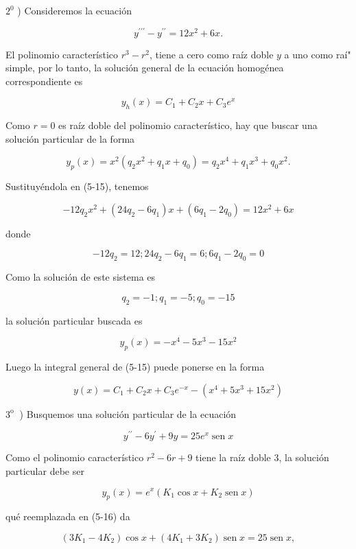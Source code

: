 \documentclass[10pt]{article}
\theoremstyle{plain}
\theoremstyle{definition}
\theoremstyle{remark}
\begin{document}
$2^{0}$ ) Consideremos la ecuación


\begin{equation*}
y^{\prime \prime \prime}-y^{\prime \prime}=12 x^{2}+6 x . \tag{5-15}
\end{equation*}


El polinomio característico $r^{3}-r^{2}$, tiene a cero como raíz doble $y$ a uno como raí" simple, por lo tanto, la solución general de la ecuación homogénea correspondiente es


$$
y_{h}(x)=C_{1}+C_{2} x+C_{3} e^{x}
$$

Como $r=0$ es raíz doble del polinomio característico, hay que buscar una solución particular de la forma

$$
y_{p}(x)=x^{2}\left(q_{2} x^{2}+q_{1} x+q_{0}\right)=q_{2} x^{4}+q_{1} x^{3}+q_{0} x^{2} .
$$

Sustituyéndola en (5-15), tenemos

$$
-12 q_{2} x^{2}+\left(24 q_{2}-6 q_{1}\right) x+\left(6 q_{1}-2 q_{0}\right)=12 x^{2}+6 x
$$

donde

$$
-12 q_{2}=12 ; 24 q_{2}-6 q_{1}=6 ; 6 q_{1}-2 q_{0}=0
$$

Como la solución de este sistema es

$$
q_{2}=-1 ; q_{1}=-5 ; q_{0}=-15
$$

la solución particular buscada es

$$
y_{p}(x)=-x^{4}-5 x^{3}-15 x^{2}
$$

Luego la integral general de (5-15) puede ponerse en la forma

$$
y(x)=C_{1}+C_{2} x+C_{3} e^{-x}-\left(x^{4}+5 x^{3}+15 x^{2}\right)
$$

$3^{\text {o }}$ ) Busquemos una solución particular de la ecuación


\begin{equation*}
y^{\prime \prime}-6 y^{\prime}+9 y=25 e^{x} \operatorname{sen} x \tag{5-16}
\end{equation*}


Como el polinomio característico $r^{2}-6 r+9$ tiene la raíz doble 3, la solución particular debe ser

$$
y_{p}(x)=e^{x}\left(K_{1} \cos x+K_{2} \operatorname{sen} x\right)
$$

qué reemplazada en (5-16) da

$$
\left(3 K_{1}-4 K_{2}\right) \cos x+\left(4 K_{1}+3 K_{2}\right) \operatorname{sen} x=25 \operatorname{sen} x,
$$
\end{document}
